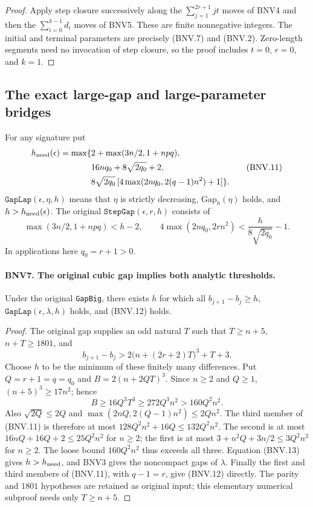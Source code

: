 \begin{proof}
Apply step closure successively along the $\sum_{j=1}^{2r+1}jt$ moves of
BNV4 and then the $\sum_{i=0}^{k-1}d_i$ moves of BNV5.  These are finite
nonnegative integers.  The initial and terminal parameters are precisely
(BNV.7) and (BNV.2).  Zero-length segments need no invocation of step
closure, so the proof includes $t=0$, $r=0$, and $k=1$.
\end{proof}

\subsection{The exact large-gap and large-parameter bridges}

For any signature put
\[
 \begin{split}
 h_{\rm need}(\epsilon)=\max\{&2+\max(3n/2,1+npq),\\
 &16nq_0+8\sqrt{2q_0}+2,\\
 &8\sqrt{2q_0}\,[4\max(2nq_0,2(q-1)n^2)+1]\}.
 \end{split}
 \tag{BNV.11}
\]
$\texttt{GapLap}(\epsilon,\eta,h)$ means that $\eta$ is strictly
decreasing, $\mathrm{Gap}_h(\eta)$ holds, and $h>h_{\rm need}(\epsilon)$.
The original $\texttt{StepGap}(\epsilon,r,h)$ consists of
\[
 \max(3n/2,1+npq)<h-2,\qquad
 4\max(2nq_0,2rn^2)<\frac{h}{8\sqrt{2q_0}}-1.
 \tag{BNV.12}
\]
In applications here $q_0=r+1>0$.

\paragraph{BNV7. The original cubic gap implies both analytic thresholds.}
\label{claim:BNV7}
Under the original \texttt{GapBig}, there exists $h$ for which all
$b_{j+1}-b_j\ge h$, $\texttt{GapLap}(\epsilon,\lambda,h)$ holds, and
(BNV.12) holds.

\begin{proof}
The original gap supplies an odd natural $T$ such that $T\ge n+5$,
$n+T\ge1801$, and
\[
 b_{j+1}-b_j>2\bigl(n+(2r+2)T\bigr)^3+T+3.
 \tag{BNV.13}
\]
Choose $h$ to be the minimum of these finitely many differences.  Put
$Q=r+1=q=q_0$ and $B=2(n+2QT)^3$.  Since $n\ge2$ and $Q\ge1$,
$(n+5)^3\ge17n^2$; hence
\[
 B\ge16Q^3T^3\ge272Q^3n^2>160Q^2n^2.
\]
Also $\sqrt{2Q}\le2Q$ and
$\max(2nQ,2(Q-1)n^2)\le2Qn^2$.  The third member of (BNV.11) is
therefore at most
$128Q^2n^2+16Q\le132Q^2n^2$.
The second is at most $16nQ+16Q+2\le25Q^2n^2$ for $n\ge2$;
the first is at most $3+n^2Q+3n/2\le3Q^2n^2$ for $n\ge2$.
The loose bound $160Q^2n^2$ thus exceeds all three.  Equation (BNV.13)
gives $h>h_{\rm need}$, and BNV3 gives the noncompact gaps of $\lambda$.
Finally the first and third members of (BNV.11), with $q-1=r$, give
(BNV.12) directly.  The parity and $1801$ hypotheses are retained as
original input; this elementary numerical subproof needs only $T\ge n+5$.
\end{proof}

